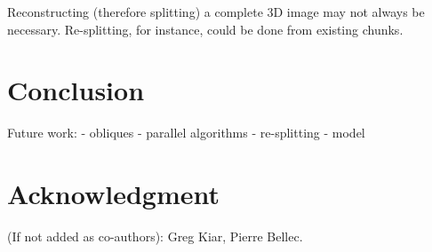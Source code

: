 \documentclass[10pt, conference, compsocconf]{IEEEtran}
\begin{document}
Reconstructing (therefore splitting) a complete 3D image may not
always be necessary. Re-splitting, for instance, could be done from
existing chunks.

\section{Conclusion}

Future work:
- obliques
- parallel algorithms
- re-splitting
- model

\section*{Acknowledgment}

(If not added as co-authors): Greg Kiar, Pierre Bellec.



\end{document}
